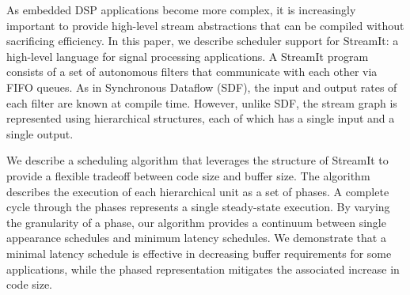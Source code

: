 As embedded DSP applications become more complex, it is increasingly
important to provide high-level stream abstractions that can be
compiled without sacrificing efficiency.  In this paper, we describe
scheduler support for StreamIt: a high-level language for signal
processing applications.  A StreamIt program consists of a set of
autonomous filters that communicate with each other via FIFO queues.
As in Synchronous Dataflow (SDF), the input and output rates of each
filter are known at compile time.  However, unlike SDF, the stream
graph is represented using hierarchical structures, each of which has
a single input and a single output.

We describe a scheduling algorithm that leverages the structure of
StreamIt to provide a flexible tradeoff between code size and buffer
size.  The algorithm describes the execution of each hierarchical unit
as a set of phases.  A complete cycle through the phases represents a
single steady-state execution.  By varying the granularity of a phase,
our algorithm provides a continuum between single appearance schedules
and minimum latency schedules.  We demonstrate that a minimal latency
schedule is effective in decreasing buffer requirements for some
applications, while the phased representation mitigates the associated
increase in code size.

